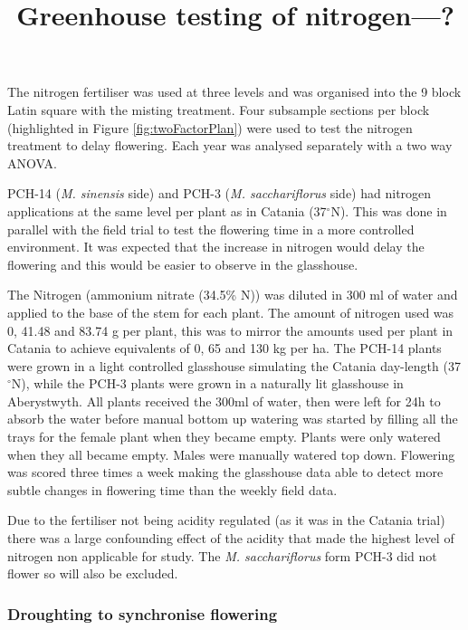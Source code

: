 \documentclass[fleqn, 15pt, lineno]{olplainarticle}
\begin{document}
The nitrogen fertiliser was used at three levels and was organised into the 9 block Latin square with the misting treatment.
Four subsample sections per block (highlighted in Figure \ref{fig:twoFactorPlan}) were used to test the nitrogen treatment to delay flowering.
Each year was analysed separately with a two way ANOVA.



\title{Greenhouse testing of nitrogen---?}

PCH-14 (\textit{M. sinensis} side) and PCH-3 (\textit{M. sacchariflorus} side) had nitrogen applications at the same level per plant as in Catania (37$^{\circ}$N).
This was done in parallel with the field trial to test the flowering time in a more controlled environment.
It was expected that the increase in nitrogen would delay the flowering and this would be easier to observe in the glasshouse.

The Nitrogen (ammonium nitrate (34.5\% N)) was diluted in 300 ml of water and applied to the base of the stem for each plant.
The amount of nitrogen used was 0, 41.48 and 83.74 g per plant, this was to mirror the amounts used per plant in Catania to achieve equivalents of 0, 65 and 130 kg per ha.
The PCH-14 plants were grown in a light controlled glasshouse simulating the Catania day-length (37$^{\circ}$N), while the PCH-3 plants were grown in a naturally lit glasshouse in Aberystwyth.
All plants received the 300ml of water, then were left for 24h to absorb the water before manual bottom up watering was started by filling all the trays for the female plant when they became empty.
Plants were only watered when they all became empty.
Males were manually watered top down.
Flowering was scored three times a week making the glasshouse data able to detect more subtle changes in flowering time than the weekly field data.

Due to the fertiliser not being acidity regulated (as it was in the Catania trial) there was a large confounding effect of the acidity that made the highest level of nitrogen non applicable for study.
The \textit{M. sacchariflorus} form PCH-3 did not flower so will also be excluded.




\FloatBarrier
\subsubsection{Droughting to synchronise flowering}
\end{document}
